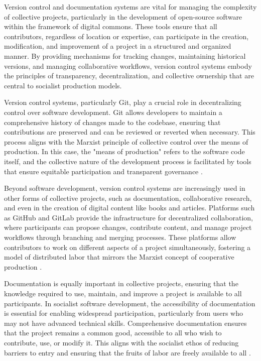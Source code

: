 \begin{refsection}
Version control and documentation systems are vital for managing the complexity of collective projects, particularly in the development of open-source software within the framework of digital commons. These tools ensure that all contributors, regardless of location or expertise, can participate in the creation, modification, and improvement of a project in a structured and organized manner. By providing mechanisms for tracking changes, maintaining historical versions, and managing collaborative workflows, version control systems embody the principles of transparency, decentralization, and collective ownership that are central to socialist production models.

Version control systems, particularly Git, play a crucial role in decentralizing control over software development. Git allows developers to maintain a comprehensive history of changes made to the codebase, ensuring that contributions are preserved and can be reviewed or reverted when necessary. This process aligns with the Marxist principle of collective control over the means of production. In this case, the "means of production" refers to the software code itself, and the collective nature of the development process is facilitated by tools that ensure equitable participation and transparent governance \cite[pp.~123-125]{raymond2001}. 

Beyond software development, version control systems are increasingly used in other forms of collective projects, such as documentation, collaborative research, and even in the creation of digital content like books and articles. Platforms such as GitHub and GitLab provide the infrastructure for decentralized collaboration, where participants can propose changes, contribute content, and manage project workflows through branching and merging processes. These platforms allow contributors to work on different aspects of a project simultaneously, fostering a model of distributed labor that mirrors the Marxist concept of cooperative production \cite[pp.~210-211]{torvalds2016}.

Documentation is equally important in collective projects, ensuring that the knowledge required to use, maintain, and improve a project is available to all participants. In socialist software development, the accessibility of documentation is essential for enabling widespread participation, particularly from users who may not have advanced technical skills. Comprehensive documentation ensures that the project remains a common good, accessible to all who wish to contribute, use, or modify it. This aligns with the socialist ethos of reducing barriers to entry and ensuring that the fruits of labor are freely available to all \cite[pp.~64-66]{williams2002}.


\end{refsection}

